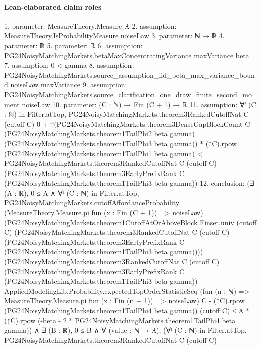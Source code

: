 \documentclass[10pt]{article}
\begin{document}
\paragraph{Lean-elaborated claim roles}\begin{ReviewVerbatim}
1. parameter: MeasureTheory.Measure ℝ
2. assumption: MeasureTheory.IsProbabilityMeasure noiseLaw
3. parameter: ℕ → ℝ
4. parameter: ℝ
5. parameter: ℝ
6. assumption: PG24NoisyMatchingMarkets.betaMaxConcentratingVariance maxVariance beta
7. assumption: 0 < gamma
8. assumption: PG24NoisyMatchingMarkets.source_assumption_iid_beta_max_variance_bound noiseLaw maxVariance
9. assumption: PG24NoisyMatchingMarkets.source_clarification_one_draw_finite_second_moment noiseLaw
10. parameter: (C : ℕ) → Fin (C + 1) → ℝ
11. assumption: ∀ᶠ (C : ℕ) in Filter.atTop,
  PG24NoisyMatchingMarkets.theorem3RankedCutoffNat C (cutoff C) 0 +
      ↑(PG24NoisyMatchingMarkets.theorem3DenseGapBlockCount C (PG24NoisyMatchingMarkets.theorem1TailPhi2 beta gamma)
            (PG24NoisyMatchingMarkets.theorem1TailPhi3 beta gamma)) *
        (↑C).rpow (PG24NoisyMatchingMarkets.theorem1TailPhi1 beta gamma) <
    PG24NoisyMatchingMarkets.theorem3RankedCutoffNat C (cutoff C)
      (PG24NoisyMatchingMarkets.theorem3EarlyPrefixRank C (PG24NoisyMatchingMarkets.theorem1TailPhi3 beta gamma))
12. conclusion: (∃ (A : ℝ),
    0 ≤ A ∧
      ∀ᶠ (C : ℕ) in Filter.atTop,
        PG24NoisyMatchingMarkets.cutoffAffordanceProbability
            (MeasureTheory.Measure.pi fun (x : Fin (C + 1)) => noiseLaw)
            (PG24NoisyMatchingMarkets.theorem1CutoffAtOrAboveBlock Finset.univ (cutoff C)
              (PG24NoisyMatchingMarkets.theorem3RankedCutoffNat C (cutoff C)
                (PG24NoisyMatchingMarkets.theorem3EarlyPrefixRank C
                  (PG24NoisyMatchingMarkets.theorem1TailPhi3 beta gamma))))
            (PG24NoisyMatchingMarkets.theorem3RankedCutoffNat C (cutoff C)
                  (PG24NoisyMatchingMarkets.theorem3EarlyPrefixRank C
                    (PG24NoisyMatchingMarkets.theorem1TailPhi3 beta gamma)) -
                AppliedModelingLib.Probability.expectedTopOrderStatisticSeq
                  (fun (n : ℕ) => MeasureTheory.Measure.pi fun (x : Fin (n + 1)) => noiseLaw) C -
              (↑C).rpow (PG24NoisyMatchingMarkets.theorem1TailPhi4 beta gamma))
            (cutoff C) ≤
          A * (↑C).rpow (-beta - 2 * PG24NoisyMatchingMarkets.theorem1TailPhi4 beta gamma)) ∧
  ∃ (B : ℝ),
    0 ≤ B ∧
      ∀ (value : ℕ → ℝ),
        (∀ᶠ (C : ℕ) in Filter.atTop,
            PG24NoisyMatchingMarkets.theorem3RankedCutoffNat C (cutoff C)

\end{ReviewVerbatim}
\end{document}
